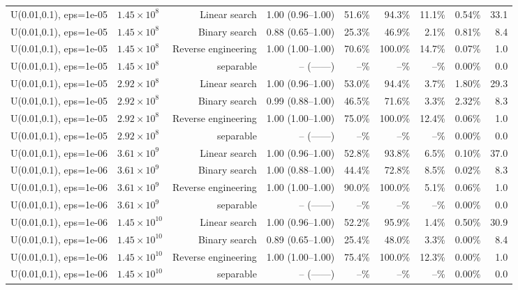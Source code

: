 \begin{tabular}{llrrrrrrr}
U(0.01,0.1), eps=1e-05 & $1.45\times 10^{8}$ & Linear search & 1.00 (0.96--1.00) & 51.6\% & 94.3\% & 11.1\% & 0.54\% & 33.1 \\
U(0.01,0.1), eps=1e-05 & $1.45\times 10^{8}$ & Binary search & 0.88 (0.65--1.00) & 25.3\% & 46.9\% & 2.1\% & 0.81\% & 8.4 \\
U(0.01,0.1), eps=1e-05 & $1.45\times 10^{8}$ & Reverse engineering & 1.00 (1.00--1.00) & 70.6\% & 100.0\% & 14.7\% & 0.07\% & 1.0 \\
U(0.01,0.1), eps=1e-05 & $1.45\times 10^{8}$ & separable & -- (------) & --\% & --\% & --\% & 0.00\% & 0.0 \\
U(0.01,0.1), eps=1e-05 & $2.92\times 10^{8}$ & Linear search & 1.00 (0.96--1.00) & 53.0\% & 94.4\% & 3.7\% & 1.80\% & 29.3 \\
U(0.01,0.1), eps=1e-05 & $2.92\times 10^{8}$ & Binary search & 0.99 (0.88--1.00) & 46.5\% & 71.6\% & 3.3\% & 2.32\% & 8.3 \\
U(0.01,0.1), eps=1e-05 & $2.92\times 10^{8}$ & Reverse engineering & 1.00 (1.00--1.00) & 75.0\% & 100.0\% & 12.4\% & 0.06\% & 1.0 \\
U(0.01,0.1), eps=1e-05 & $2.92\times 10^{8}$ & separable & -- (------) & --\% & --\% & --\% & 0.00\% & 0.0 \\
U(0.01,0.1), eps=1e-06 & $3.61\times 10^{9}$ & Linear search & 1.00 (0.96--1.00) & 52.8\% & 93.8\% & 6.5\% & 0.10\% & 37.0 \\
U(0.01,0.1), eps=1e-06 & $3.61\times 10^{9}$ & Binary search & 1.00 (0.88--1.00) & 44.4\% & 72.8\% & 8.5\% & 0.02\% & 8.3 \\
U(0.01,0.1), eps=1e-06 & $3.61\times 10^{9}$ & Reverse engineering & 1.00 (1.00--1.00) & 90.0\% & 100.0\% & 5.1\% & 0.06\% & 1.0 \\
U(0.01,0.1), eps=1e-06 & $3.61\times 10^{9}$ & separable & -- (------) & --\% & --\% & --\% & 0.00\% & 0.0 \\
U(0.01,0.1), eps=1e-06 & $1.45\times 10^{10}$ & Linear search & 1.00 (0.96--1.00) & 52.2\% & 95.9\% & 1.4\% & 0.50\% & 30.9 \\
U(0.01,0.1), eps=1e-06 & $1.45\times 10^{10}$ & Binary search & 0.89 (0.65--1.00) & 25.4\% & 48.0\% & 3.3\% & 0.00\% & 8.4 \\
U(0.01,0.1), eps=1e-06 & $1.45\times 10^{10}$ & Reverse engineering & 1.00 (1.00--1.00) & 75.4\% & 100.0\% & 12.3\% & 0.00\% & 1.0 \\
U(0.01,0.1), eps=1e-06 & $1.45\times 10^{10}$ & separable & -- (------) & --\% & --\% & --\% & 0.00\% & 0.0 \\

\end{tabular}
